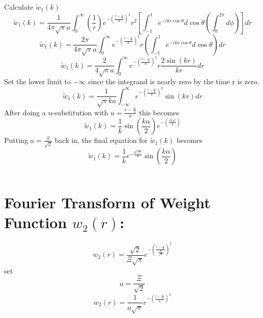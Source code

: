\documentclass[double,12pt]{beavtex}
\begin{document}
\noindent Calculate $\widetilde{w}_1(k)$ 
\begin{equation}{\widetilde{w}_1(k)=\frac{1}{4{\pi}\sqrt{\pi}a}\int_{0}^{\infty}\left(\frac{1}{r}\right)e^{-\left(\frac{r-\frac{\alpha}{2}}{a}\right)^2}r^2\left[\int_{-1}^{1}e^{-ikr\cos\theta}d{\cos\theta}\left(\int_{0}^{2\pi}d{\phi}\right)\right]d{r}}\end{equation}
\[{}\]
\begin{equation}{\widetilde{w}_1(k)=\frac{2\pi}{4{\pi}\sqrt{\pi}a}\int_{0}^{\infty}e^{-\left(\frac{r-\frac{\alpha}{2}}{a}\right)^2}r\left(\int_{-1}^{1}e^{-ikr\cos\theta}d{\cos\theta}\right)d{r}}\end{equation}
\[{}\]
\begin{equation}{\widetilde{w}_1(k)=\frac{2}{4\sqrt{\pi}a}\int_{0}^{\infty}e^{-\left(\frac{r-\frac{\alpha}{2}}{a}\right)^2}r\frac{2\sin(kr)}{kr}d{r}}\end{equation}
Set the lower limit to $-\infty$ since the integrand is nearly zero by the time r is zero. 
\begin{equation}{\widetilde{w}_1(k)=\frac{1}{\sqrt{\pi}ka}\int_{-\infty}^{\infty}e^{-\left(\frac{r-\frac{\alpha}{2}}{a}\right)^2}\sin(kr)d{r}}\end{equation}
After doing a u-substitution with $u=\frac{r-\frac{\alpha}{2}}{a}$ this becomes
\begin{equation}{\widetilde{w}_1(k)=\frac{1}{k}\sin\left(\frac{k\alpha}{2}\right)e^{-\left(\frac{k^2a^2}{4}\right)}}\end{equation}
Putting $a=\frac{\Xi}{\sqrt{2}}$ back in, the final equation for $\widetilde{w}_1(k)$ becomes
\begin{equation}
    \widetilde{w}_1(k)=\frac{1}{k}e^{-\frac{k^2\Xi^2}{8}}\sin\left(\frac{k\alpha}{2}\right)
\end{equation}

\[{}\]
\section{Fourier Transform of Weight Function $w_{2}(r)$:}
\begin{equation}{w_2(r)=\frac{\sqrt{2}}{\Xi\sqrt{\pi}}e^{-\left(\frac{r-\frac{\alpha}{2}}{\frac{\Xi}{\sqrt{2}}}\right)^2}}\end{equation}
set 
\begin{equation}{a=\frac{\Xi}{\sqrt{2}}}\end{equation}
\begin{equation}{w_2(r)=\frac{1}{a\sqrt{\pi}}e^{-\left(\frac{r-\frac{\alpha}{2}}{a}\right)^2}}\end{equation}
\end{document}

